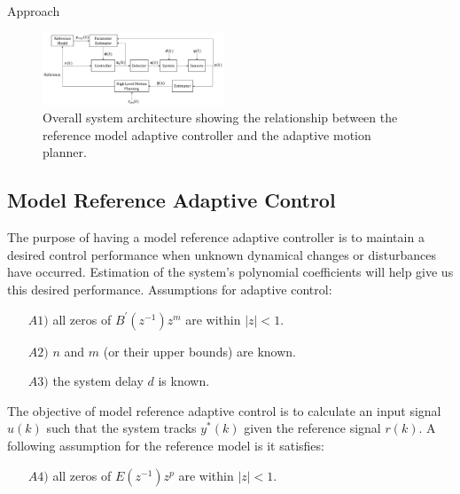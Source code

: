 
\begin{section}{Approach}
\label{sec:approach}



\begin{figure}
\vspace{1pt}
\centering
\includegraphics[width=0.48\textwidth]{sys_arch.png}
\caption{Overall system architecture showing the relationship between the reference model adaptive controller and the adaptive motion planner.}
\label{fig:system_arch}
\end{figure}

\subsection{Model Reference Adaptive Control}

The purpose of having a model reference adaptive controller is to maintain a desired control performance when unknown dynamical changes or disturbances have occurred. Estimation of the system's polynomial coefficients will help give us this desired performance.
Assumptions for adaptive control: 
	\begin{enumerate}[leftmargin=4\parindent]
	\item[$A1)$] all zeros of $B^{'}(z^{-1})z^m$ are within $|z|<1$. 
	\item[$A2)$] $n$ and $m$ (or their upper bounds) are known. 
	\item[$A3)$] the system delay $d$ is known.
	\end{enumerate}
The objective of model reference adaptive control is to calculate an input signal $u(k)$ such that the system tracks $y^{*}(k)$ given the reference signal $r(k)$. 
A following assumption for the reference model is it satisfies:
    \begin{enumerate}[leftmargin=4\parindent]
	\item[$A4)$] all zeros of $E(z^{-1})z^p$ are within $|z|<1$. 
	\end{enumerate}


\end{section}
